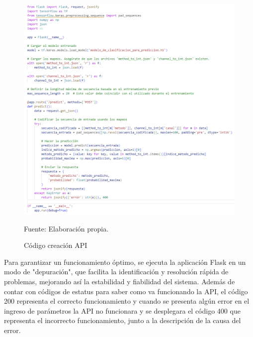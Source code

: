 \begin{figure}[H]
    \begin{minipage}[t]{0.9\textwidth}
        \caption{Código creación API}
        \label{API_creation}        
    \end{minipage}

    \vspace{10pt}

    \begin{minipage}[b]{1\textwidth}
        \centering
        \includegraphics[width=\textwidth]{img/SS_API.png}        
    \end{minipage}

    \begin{minipage}[t]{0.9\textwidth}
        Fuente: Elaboración propia.
    \end{minipage}
\end{figure}

Para garantizar un funcionamiento óptimo, se ejecuta la aplicación Flask en un modo de "depuración", que facilita la identificación y resolución rápida de problemas, mejorando así la estabilidad y fiabilidad del sistema. Además de contar con códigos de estatus para saber como va funcionando la API, el código 200 representa el correcto funcionamiento y cuando se presenta algún error en el ingreso de parámetros la API no funcionara y se desplegara el código 400 que representa el incorrecto funcionamiento, junto a la descripción de la causa del error.


